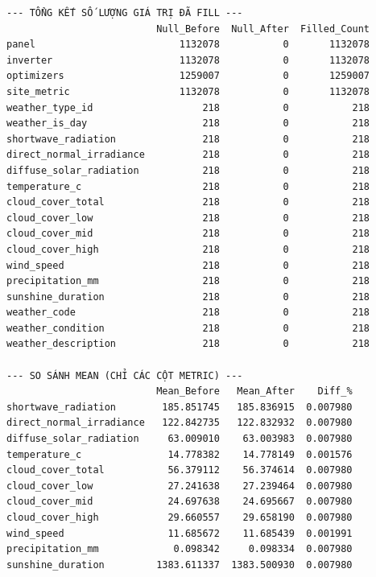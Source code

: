 \begingroup
\par{}\vspace{8pt}
\footnotesize\renewcommand{\baselinestretch}{1.0}\selectfont
\begin{verbatim}
--- TỔNG KẾT SỐ LƯỢNG GIÁ TRỊ ĐÃ FILL ---
                          Null_Before  Null_After  Filled_Count
panel                         1132078           0       1132078
inverter                      1132078           0       1132078
optimizers                    1259007           0       1259007
site_metric                   1132078           0       1132078
weather_type_id                   218           0           218
weather_is_day                    218           0           218
shortwave_radiation               218           0           218
direct_normal_irradiance          218           0           218
diffuse_solar_radiation           218           0           218
temperature_c                     218           0           218
cloud_cover_total                 218           0           218
cloud_cover_low                   218           0           218
cloud_cover_mid                   218           0           218
cloud_cover_high                  218           0           218
wind_speed                        218           0           218
precipitation_mm                  218           0           218
sunshine_duration                 218           0           218
weather_code                      218           0           218
weather_condition                 218           0           218
weather_description               218           0           218

--- SO SÁNH MEAN (CHỈ CÁC CỘT METRIC) ---
                          Mean_Before   Mean_After    Diff_%
shortwave_radiation        185.851745   185.836915  0.007980
direct_normal_irradiance   122.842735   122.832932  0.007980
diffuse_solar_radiation     63.009010    63.003983  0.007980
temperature_c               14.778382    14.778149  0.001576
cloud_cover_total           56.379112    56.374614  0.007980
cloud_cover_low             27.241638    27.239464  0.007980
cloud_cover_mid             24.697638    24.695667  0.007980
cloud_cover_high            29.660557    29.658190  0.007980
wind_speed                  11.685672    11.685439  0.001991
precipitation_mm             0.098342     0.098334  0.007980
sunshine_duration         1383.611337  1383.500930  0.007980
\end{verbatim}
\endgroup

